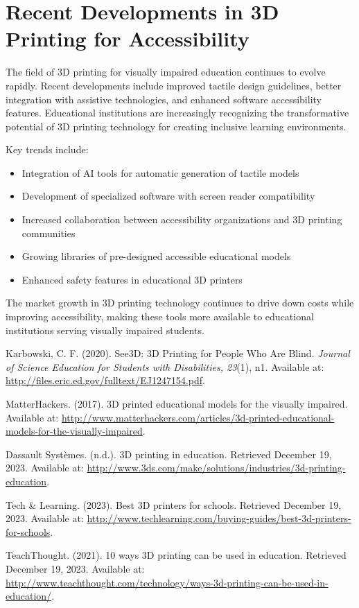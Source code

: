\section{Recent Developments in 3D Printing for Accessibility}\label{recent-developments}

The field of 3D printing for visually impaired education continues to evolve rapidly. Recent developments include improved tactile design guidelines, better integration with assistive technologies, and enhanced software accessibility features. Educational institutions are increasingly recognizing the transformative potential of 3D printing technology for creating inclusive learning environments.

Key trends include:
\begin{itemize}
    \item Integration of AI tools for automatic generation of tactile models
    \item Development of specialized software with screen reader compatibility
    \item Increased collaboration between accessibility organizations and 3D printing communities
    \item Growing libraries of pre-designed accessible educational models
    \item Enhanced safety features in educational 3D printers
\end{itemize}

The market growth in 3D printing technology continues to drive down costs while improving accessibility, making these tools more available to educational institutions serving visually impaired students.

\begin{thebibliography}{99}

 Karbowski, C. F. (2020). See3D: 3D Printing for People Who Are Blind. \textit{Journal of Science Education for Students with Disabilities, 23}(1), n1. Available at: \url{http://files.eric.ed.gov/fulltext/EJ1247154.pdf}.

 MatterHackers. (2017). 3D printed educational models for the visually impaired. Available at: \url{http://www.matterhackers.com/articles/3d-printed-educational-models-for-the-visually-impaired}.

 Dassault Systèmes. (n.d.). 3D printing in education. Retrieved December 19, 2023. Available at: \url{http://www.3ds.com/make/solutions/industries/3d-printing-education}.

 Tech \& Learning. (2023). Best 3D printers for schools. Retrieved December 19, 2023. Available at: \url{http://www.techlearning.com/buying-guides/best-3d-printers-for-schools}.

 TeachThought. (2021). 10 ways 3D printing can be used in education. Retrieved December 19, 2023. Available at: \url{http://www.teachthought.com/technology/ways-3d-printing-can-be-used-in-education/}.

\end{thebibliography}

